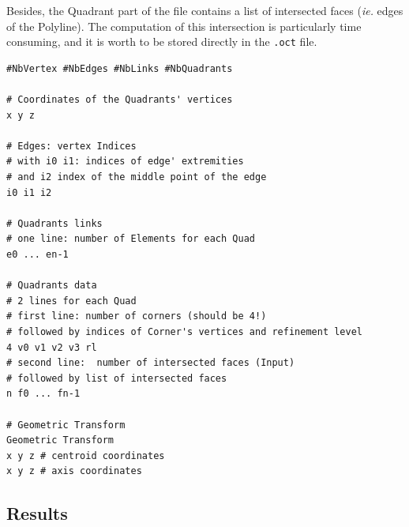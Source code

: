 \documentclass[10pt]{article}
\begin{document}
Besides, the Quadrant part of the file contains a list of intersected faces (\textit{ie.} edges of the Polyline). The computation of this intersection is particularly time consuming, and it is worth to be stored directly in the \texttt{.oct} file.

\begin{tcolorbox}[skin=enhanced,breakable]
\begin{verbatim}
#NbVertex #NbEdges #NbLinks #NbQuadrants

# Coordinates of the Quadrants' vertices
x y z

# Edges: vertex Indices
# with i0 i1: indices of edge' extremities
# and i2 index of the middle point of the edge
i0 i1 i2

# Quadrants links
# one line: number of Elements for each Quad
e0 ... en-1

# Quadrants data
# 2 lines for each Quad
# first line: number of corners (should be 4!)
# followed by indices of Corner's vertices and refinement level 
4 v0 v1 v2 v3 rl
# second line:  number of intersected faces (Input)
# followed by list of intersected faces
n f0 ... fn-1

# Geometric Transform
Geometric Transform
x y z # centroid coordinates
x y z # axis coordinates
\end{verbatim}
\end{tcolorbox}

\subsection{Results}
\end{document}
